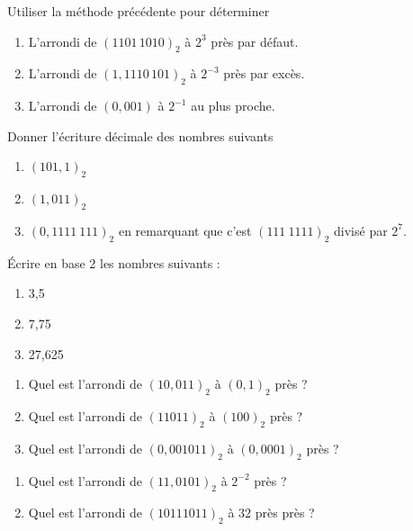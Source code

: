 \documentclass[a4paper,12pt,french]{book}
\begin{document}
\begin{exercice}[]
	Utiliser la méthode précédente pour déterminer
	\begin{enumerate}[\bfseries 1.]
		\item 	L'arrondi de $(1101\,1010)_2$ à $2^3$ près par défaut.
		\item 	L'arrondi de $(1,1110\,101)_2$ à $2^{-3}$ près par excès.
		\item 	L'arrondi de $(0,001)$ à $2^{-1}$ au plus proche.
	\end{enumerate}
\end{exercice}


\exostart

\begin{exercice}[]
	Donner l'écriture décimale des nombres suivants\begin{enumerate}[\bfseries a.]
		\item 	$(101,1)_2$
		\item 	$(1,011)_2$
		\item 	$(0,1111\ 111)_2$ en remarquant que c'est \og $(111\ 1111)_2$ divisé par $2^7$.
	\end{enumerate}
\end{exercice}
\begin{exercice}[]
	\'Ecrire en base 2 les nombres suivants :
	\begin{enumerate}[\bfseries a.]
		\item 	3,5
		\item 	7,75
		\item 	27,625
	\end{enumerate}
\end{exercice}

\begin{exercice}[]
	\begin{enumerate}[\bfseries a.]
		\item 	Quel est l'arrondi de $(10,011)_2$ à $(0,1)_2$ près ?
		\item 	Quel est l'arrondi de $(1 1011)_2$ à $(100)_2$ près ?
		\item 	Quel est l'arrondi de $(0,0010 11)_2$ à $(0,0001)_2$ près ?
	\end{enumerate}
\end{exercice}



\begin{exercice}[]
	\begin{enumerate}[\bfseries a.]
		\item 	Quel est l'arrondi de $(11,0101)_2$ à $2^{-2}$ près ?
		\item 	Quel est l'arrondi de $(1011 1011)_2$ à 32 près près ?
	\end{enumerate}
\end{exercice}
\end{document}
